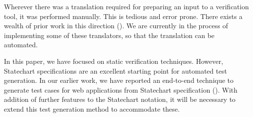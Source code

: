 \documentclass[12pt,a4paper]{article}
\begin{document}
Wherever there was a translation required for preparing an input to a verification tool, it was performed manually. This is tedious and error prone. There exists a wealth of prior work in this direction (). We are currently in the process of implementing some of these translators, so that the translation can be automated.

In this paper, we have focused on static verification techniques. However, Statechart specifications are an excellent starting point for automated test generation. In our earlier work, we have reported an end-to-end technique to generate test cases for web applications from Statechart specification (). With addition of further features to the Statechart notation, it will be necessary to extend this test generation method to accommodate these.
\end{document}
